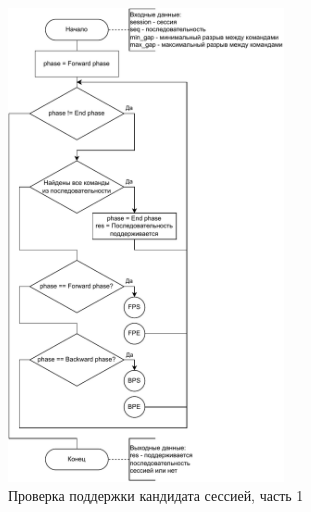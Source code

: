 
\begin{figure}[h!]
	\centering
	\includegraphics[width=0.65\textwidth]{inc/img/sessionSupportsSequence2.drawio.pdf}
	\caption{Проверка поддержки кандидата сессией, часть 1}
	\label{sessionSupportsSequence}
\end{figure}

